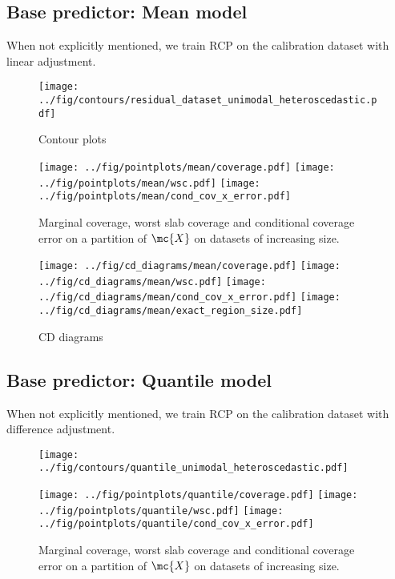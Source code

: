 
\subsection{Base predictor: Mean model}

When not explicitly mentioned, we train RCP on the calibration dataset with linear adjustment.

\begin{figure}[H]
    \centering
    \texttt{[image: ../fig/contours/residual\_dataset\_unimodal\_heteroscedastic.pdf]}
    \caption{Contour plots}
\end{figure}

\begin{figure}[H]
    \texttt{[image: ../fig/pointplots/mean/coverage.pdf]}
    \texttt{[image: ../fig/pointplots/mean/wsc.pdf]}
    \texttt{[image: ../fig/pointplots/mean/cond\_cov\_x\_error.pdf]}
    \caption{Marginal coverage, worst slab coverage and conditional coverage error on a partition of $\mc{X}$ on datasets of increasing size.}
\end{figure}

\begin{figure}[H]
    \centering
    \texttt{[image: ../fig/cd\_diagrams/mean/coverage.pdf]}
    \texttt{[image: ../fig/cd\_diagrams/mean/wsc.pdf]}
    \texttt{[image: ../fig/cd\_diagrams/mean/cond\_cov\_x\_error.pdf]}
    \texttt{[image: ../fig/cd\_diagrams/mean/exact\_region\_size.pdf]}
    \caption{CD diagrams}
\end{figure}

\subsection{Base predictor: Quantile model}

When not explicitly mentioned, we train RCP on the calibration dataset with difference adjustment.

\begin{figure}[H]
    \centering
    \texttt{[image: ../fig/contours/quantile\_unimodal\_heteroscedastic.pdf]}
    \caption{}
\end{figure}

\begin{figure}[H]
    \texttt{[image: ../fig/pointplots/quantile/coverage.pdf]}
    \texttt{[image: ../fig/pointplots/quantile/wsc.pdf]}
    \texttt{[image: ../fig/pointplots/quantile/cond\_cov\_x\_error.pdf]}
    \caption{Marginal coverage, worst slab coverage and conditional coverage error on a partition of $\mc{X}$ on datasets of increasing size.}
\end{figure}

